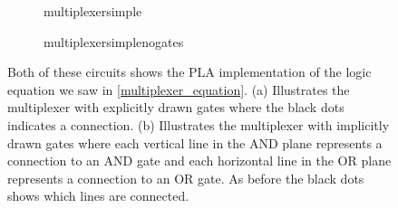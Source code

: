             \begin{figure}[h!]
                \hspace*{-1cm}
                \begin{subfigure}[t]{0.5\textwidth}
                    \vskip 0pt
                    \centering
                    {multiplexersimple}
                    \caption{ }
                    \label{fig:MultiplexerSimpleA}
                \end{subfigure}%
                \begin{subfigure}[t]{0.5\textwidth}
                    \vskip 0pt
                    {multiplexersimplenogates}
                    \caption{ }
                    \label{fig:MultiplexerSimpleB}
                \end{subfigure}%
                \caption{Both of these circuits shows the PLA implementation of the logic equation we saw in \ref{multiplexer_equation}. (a) Illustrates the multiplexer with explicitly drawn gates where the black dots indicates a connection. (b) Illustrates the multiplexer with implicitly drawn gates where each vertical line in the AND plane represents a connection to an AND gate and each horizontal line in the OR plane represents a connection to an OR gate. As before the black dots shows which lines are connected.}
                
            \end{figure}
        
        